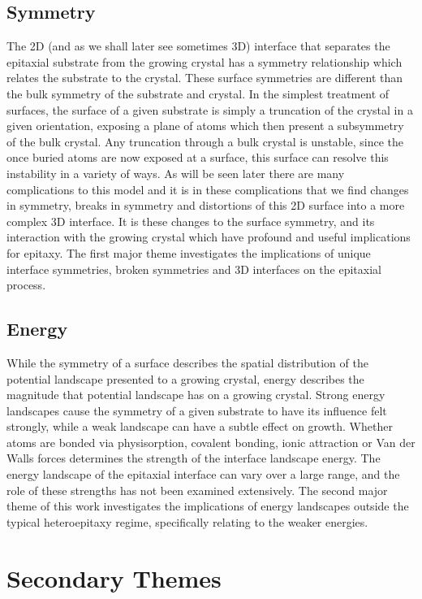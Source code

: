 \subsection{Symmetry} The 2D (and as we shall later see sometimes 3D) interface that separates the epitaxial substrate from the growing crystal has a symmetry relationship which relates the substrate to the crystal.
These surface symmetries are different than the bulk symmetry of the substrate and crystal.
In the simplest treatment of surfaces, the surface of a given substrate is simply a truncation of the crystal in a given orientation, exposing a plane of atoms which then present a subsymmetry of the bulk crystal.
Any truncation through a bulk crystal is unstable, since the once buried atoms are now exposed at a surface, this surface can resolve this instability in a variety of ways.
As will be seen later there are many complications to this model and it is in these complications that we find changes in symmetry, breaks in symmetry and distortions of this 2D surface into a more complex 3D interface.
It is these changes to the surface symmetry, and its interaction with the growing crystal which have profound and useful implications for epitaxy.
The first major theme investigates the implications of unique interface symmetries, broken symmetries and 3D interfaces on the epitaxial process.

\subsection{Energy} While the symmetry of a surface describes the spatial distribution of the potential landscape presented to a growing crystal, energy describes the magnitude that potential landscape has on a growing crystal.
Strong energy landscapes cause the symmetry of a given substrate to have its influence felt strongly, while a weak landscape can have a subtle effect on growth.
Whether atoms are bonded via physisorption, covalent bonding, ionic attraction or Van der Walls forces determines the strength of the interface landscape energy.
The energy landscape of the epitaxial interface can vary over a large range, and the role of these strengths has not been examined extensively.
The second major theme of this work investigates the implications of energy landscapes outside the typical heteroepitaxy regime, specifically relating to the weaker energies.

\section{Secondary Themes}
